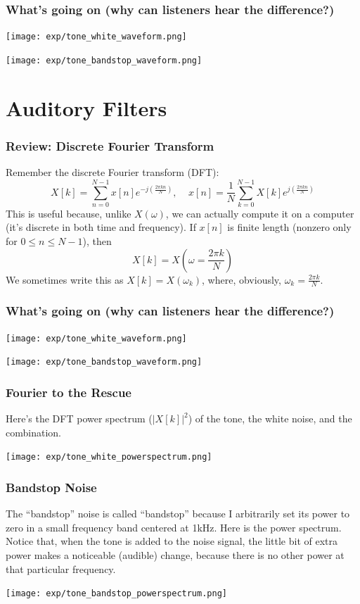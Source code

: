 \documentclass{beamer}
\begin{document}
\begin{frame}
  \frametitle{What's going on (why can listeners hear the difference?)}
  \centerline{\texttt{[image: exp/tone\_white\_waveform.png]}}
  \centerline{\texttt{[image: exp/tone\_bandstop\_waveform.png]}}
\end{frame}

\section[Filters]{Auditory Filters}
\setcounter{subsection}{1}

\begin{frame}
  \frametitle{Review: Discrete Fourier Transform}

  Remember the discrete Fourier transform (DFT):
  \[
  X[k] = \sum_{n=0}^{N-1} x[n]e^{-j\left(\frac{2\pi  kn}{N}\right)},~~~~~
  x[n]=\frac{1}{N}\sum_{k=0}^{N-1} X[k]e^{j\left(\frac{2\pi  kn}{N}\right)}
  \]
  This is useful because, unlike $X(\omega)$, we can actually compute
  it on a computer (it's discrete in both time and frequency).  If
  $x[n]$ is finite length (nonzero only for $0\le n\le N-1$), then
  \[
  X[k] = X\left(\omega=\frac{2\pi k}{N}\right)
  \]
  We sometimes write this as $X[k]=X(\omega_k)$, where, obviously, $\omega_k=\frac{2\pi k}{N}$.
\end{frame}
  
\begin{frame}
  \frametitle{What's going on (why can listeners hear the difference?)}
  \centerline{\texttt{[image: exp/tone\_white\_waveform.png]}}
  \centerline{\texttt{[image: exp/tone\_bandstop\_waveform.png]}}
\end{frame}

\begin{frame}
  \frametitle{Fourier to the Rescue}

  Here's the DFT power spectrum ($|X[k]|^2$) of the tone, the white
  noise, and the combination.
  \centerline{\texttt{[image: exp/tone\_white\_powerspectrum.png]}}
\end{frame}

\begin{frame}
  \frametitle{Bandstop Noise}

  The ``bandstop'' noise is called ``bandstop'' because I arbitrarily set
  its power to zero in a small frequency band centered at 1kHz.  Here is the
  power spectrum.  Notice that, when the tone is added to the noise signal, 
  the little bit of extra power makes a noticeable (audible) change, because
  there is no other power at that particular frequency.
  \centerline{\texttt{[image: exp/tone\_bandstop\_powerspectrum.png]}}
\end{frame}
\end{document}
